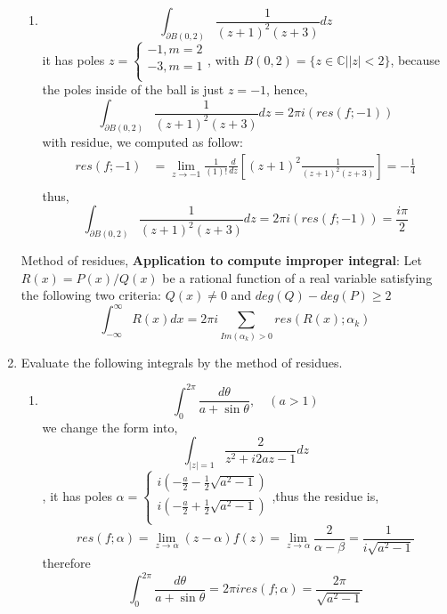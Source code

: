 \documentclass[a4paper,12pt]{article}
\newcommand{\C}{\mathbb{C}}
\begin{document}
\begin{enumerate}
\begin{enumerate}
	\item $$\int_{\partial B(0,2)} \frac{1}{(z+1)^2(z+3)}dz$$ it has poles $z=\begin{cases}
	-1, m= 2\\
	-3, m= 1\\
	\end{cases}$, with $B(0,2) = \{z\in \C | |z|<2\}$, because the poles inside of the ball is just $z = -1$, hence, $$\int_{\partial B(0,2)} \frac{1}{(z+1)^2(z+3)}dz = 2\pi i (res(f;-1))$$
	with residue, we computed as follow:
	\begin{equation*}
	\begin{aligned}
	res(f;-1) &= \lim_{z\to -1} \frac{1}{(1)!} \frac{d}{dz} \left[ (z+1)^2 \frac{1}{(z+1)^2(z+3)}\right] = -\frac{1}{4}\\
	\end{aligned}
	\end{equation*}
	thus, $$\int_{\partial B(0,2)} \frac{1}{(z+1)^2(z+3)}dz = 2\pi i (res(f;-1)) = \frac{i\pi}{2}$$
\end{enumerate}

Method of residues, \textbf{Application to compute improper integral}:
Let $R(x) = P(x)/Q(x)$ be a rational function of a real variable satisfying the following two criteria: $Q(x) \neq 0$ and $deg (Q) − deg (P) \geq2$
\begin{equation}
\int_{-\infty}^{\infty} R(x) dx = 2 \pi i\sum_{Im(\alpha_k) > 0} res(R(x);\alpha_k)
\end{equation}
\item Evaluate the following integrals by the method of residues.
\begin{enumerate}
	\item $$\int_{0}^{2\pi} \frac{d\theta}{a+\sin\theta}, \quad (a>1)$$
	we change the form into,
	$$\int_{|z|=1} \frac{2}{z^2+i2az-1} dz$$, it has poles $\alpha=\begin{cases}
	i\left( -\frac{a}{2} -\frac{1}{2}\sqrt{a^2-1} \right)\\
	i\left( -\frac{a}{2} +\frac{1}{2}\sqrt{a^2-1} \right)\\
	\end{cases}$,thus the residue is,
	\begin{equation*}
	res(f;\alpha) = \lim_{z\to \alpha} (z-\alpha)f(z) = \lim_{z\to \alpha} \frac{2}{\alpha - \beta} = \frac{1}{i\sqrt{a^2-1}}
	\end{equation*}
	therefore
	\begin{equation*}
	\int_{0}^{2\pi} \frac{d\theta}{a+\sin\theta} = 2\pi i res(f;\alpha) = \frac{2\pi}{\sqrt{a^2-1}}
	\end{equation*}
	

\end{enumerate}
\end{enumerate}
\end{document}
